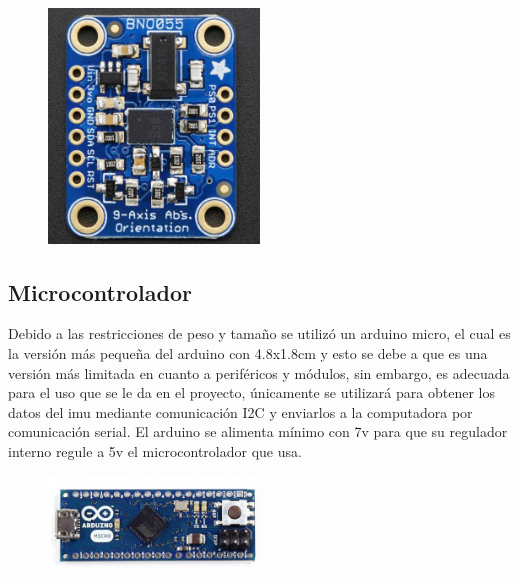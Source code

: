         \begin{figure}[htbp]
        	\centering
        	\includegraphics[width=0.5\textwidth]{./pictures/bno055}
        	\caption{}\label{fig: figura}
        \end{figure}
        
        \subsection{Microcontrolador}
        Debido a las restricciones de peso y tamaño se utilizó un arduino micro, el cual es la versión más pequeña del arduino con 4.8x1.8cm y esto se debe a que es una versión más limitada en cuanto a periféricos y módulos, sin embargo, es adecuada para el uso que se le da en el proyecto, únicamente se utilizará para obtener los datos del imu mediante comunicación I2C y enviarlos a la computadora por comunicación serial. El arduino se alimenta mínimo con 7v para que su regulador interno regule a 5v el microcontrolador que usa.
        \begin{figure}[htbp]
        	\centering
        	\includegraphics[width=0.5\textwidth]{./pictures/arduino}
        	\caption{}\label{fig: figura}
        \end{figure}
        
